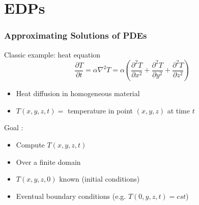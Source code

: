 \documentclass[xcolor={rgb,x11names,svgnames},rgb,x11names,svgnames]{beamer}
\begin{document}


\section{EDPs}


\begin{frame}
\frametitle{Approximating Solutions of PDEs}

\begin{block}{Classic example: heat equation}
  \[
    \frac{\partial T}{\partial t} = \alpha \nabla^2 T = \alpha \left( \frac{\partial^2 T}{\partial x^2} + \frac{\partial^2 T}{\partial y^2} + \frac{\partial^2 T}{\partial z^2}\right)
  \]
  
  \begin{itemize}
  \item Heat diffusion in homogeneous material
  \item $T(x,y,z,t) = $ temperature in point $(x,y,z)$ at time $t$
  \end{itemize}
\end{block}

\medskip
\begin{alertblock}{Goal :}
\begin{itemize}
\item Compute $T(x, y, z, t)$
\item Over a finite domain
\item $T(x, y, z, 0)$ known (initial conditions)
\item Eventual boundary conditions (e.g. $T(0, y, z, t) = cst$)
\end{itemize}
\end{alertblock}
\end{frame}

\end{document}
